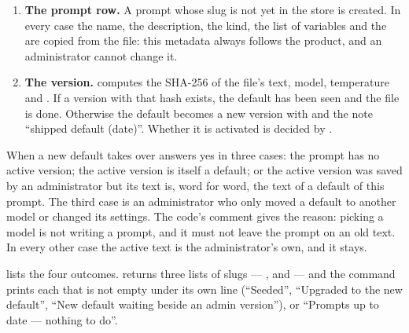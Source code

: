 \begin{enumerate}
  \item \textbf{The prompt row.} A prompt whose slug is not yet in the store is created. In
    every case the name, the description, the kind, the list of variables and the
     are copied from the file: this metadata always follows the product,
    and an administrator cannot change it.
  \item \textbf{The version.}  computes the SHA-256 of the file's text,
    model, temperature and . If a version with that hash exists, the default
    has been seen and the file is done. Otherwise the default becomes a new version with
      and the note \enquote{shipped default (date)}. Whether it is
    activated is decided by .
\end{enumerate}

\begin{codebox}{When a new default takes over}
 answers yes in three cases: the prompt has no active
version; the active version is itself a default; or the active version was saved by an
administrator but its text is, word for word, the text of a default of this prompt. The third
case is an administrator who only moved a default to another model or changed its settings. The
code's comment gives the reason: picking a model is not writing a prompt, and it must not leave
the prompt on an old text. In every other case the active text is the administrator's own, and
it stays.
\end{codebox}

 lists the four outcomes.  returns three lists of
slugs — ,  and  — and the command prints each that is
not empty under its own line (\enquote{Seeded}, \enquote{Upgraded to the new default},
\enquote{New default waiting beside an admin version}), or \enquote{Prompts up to date — nothing
to do}.

